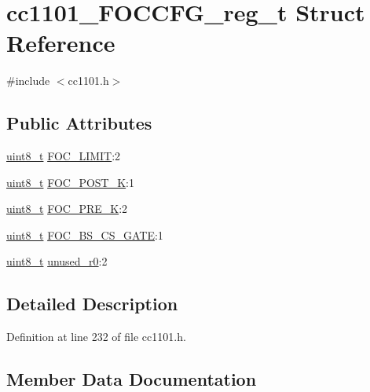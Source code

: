 \hypertarget{structcc1101___f_o_c_c_f_g__reg__t}{}\section{cc1101\+\_\+\+F\+O\+C\+C\+F\+G\+\_\+reg\+\_\+t Struct Reference}
\label{structcc1101___f_o_c_c_f_g__reg__t}


{\ttfamily \#include $<$cc1101.\+h$>$}

\subsection*{Public Attributes}
\begin{DoxyCompactItemize}
\item 
\hyperlink{_p_e___types_8h_aba7bc1797add20fe3efdf37ced1182c5}{uint8\+\_\+t} \hyperlink{structcc1101___f_o_c_c_f_g__reg__t_a7c0e58e4cff0421f8f3421b46fbfe7fd}{F\+O\+C\+\_\+\+L\+I\+M\+IT}\+:2
\item 
\hyperlink{_p_e___types_8h_aba7bc1797add20fe3efdf37ced1182c5}{uint8\+\_\+t} \hyperlink{structcc1101___f_o_c_c_f_g__reg__t_a39be001516b4d72e05fb161b98e2b255}{F\+O\+C\+\_\+\+P\+O\+S\+T\+\_\+K}\+:1
\item 
\hyperlink{_p_e___types_8h_aba7bc1797add20fe3efdf37ced1182c5}{uint8\+\_\+t} \hyperlink{structcc1101___f_o_c_c_f_g__reg__t_add5c4ce00d20d11efb79734b86532018}{F\+O\+C\+\_\+\+P\+R\+E\+\_\+K}\+:2
\item 
\hyperlink{_p_e___types_8h_aba7bc1797add20fe3efdf37ced1182c5}{uint8\+\_\+t} \hyperlink{structcc1101___f_o_c_c_f_g__reg__t_a72a6a50ad4a9dff37b470d2228360304}{F\+O\+C\+\_\+\+B\+S\+\_\+\+C\+S\+\_\+\+G\+A\+TE}\+:1
\item 
\hyperlink{_p_e___types_8h_aba7bc1797add20fe3efdf37ced1182c5}{uint8\+\_\+t} \hyperlink{structcc1101___f_o_c_c_f_g__reg__t_adfd9370933fd173d5bdbc68e1b3c07c9}{unused\+\_\+r0}\+:2
\end{DoxyCompactItemize}


\subsection{Detailed Description}


Definition at line 232 of file cc1101.\+h.



\subsection{Member Data Documentation}
